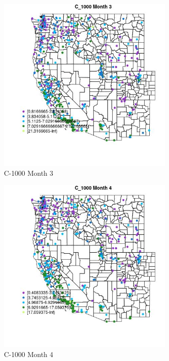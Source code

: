 \begin{figure} 
\centering  
\includegraphics[width=0.77\textwidth]{Code_Outputs/ML_input_report_ML_input_PM25_Step5_part_d_de_duplicated_aves_ML_input_MapObsMo3C_1000.jpg} 
\caption{\label{fig:ML_input_report_ML_input_PM25_Step5_part_d_de_duplicated_aves_ML_inputMapObsMo3C_1000}C-1000 Month 3} 
\end{figure} 
 

\begin{figure} 
\centering  
\includegraphics[width=0.77\textwidth]{Code_Outputs/ML_input_report_ML_input_PM25_Step5_part_d_de_duplicated_aves_ML_input_MapObsMo4C_1000.jpg} 
\caption{\label{fig:ML_input_report_ML_input_PM25_Step5_part_d_de_duplicated_aves_ML_inputMapObsMo4C_1000}C-1000 Month 4} 
\end{figure} 
 

